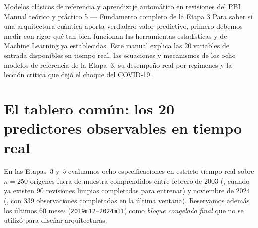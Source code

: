 \documentclass[12pt,letterpaper]{article}
\begin{document}
\apacabecera
  {Modelos clásicos de referencia y aprendizaje automático en revisiones del PBI}
  {Manual teórico y práctico 5 — Fundamento completo de la Etapa 3}
  {Para saber si una arquitectura cuántica aporta verdadero valor predictivo, primero debemos medir con rigor qué tan bien funcionan las herramientas estadísticas y de Machine Learning ya establecidas. Este manual explica las \(20\) variables de entrada disponibles en tiempo real, las ecuaciones y mecanismos de los ocho modelos de referencia de la Etapa~3, su desempeño real por regímenes y la lección crítica que dejó el choque del COVID-19.}

\section{El tablero común: los 20 predictores observables en tiempo real}

En las Etapas~3 y~5 evaluamos ocho especificaciones en estricto tiempo real sobre \(n = 250\) orígenes fuera de muestra comprendidos entre febrero de 2003 (, cuando ya existen \(90\) revisiones limpias completadas para entrenar) y noviembre de 2024 (, con \(339\) observaciones completadas en la última ventana). Reservamos además los últimos \(60\) meses (\texttt{2019m12}--\texttt{2024m11}) como \emph{bloque congelado final} que no se utilizó para diseñar arquitecturas.
\end{document}
